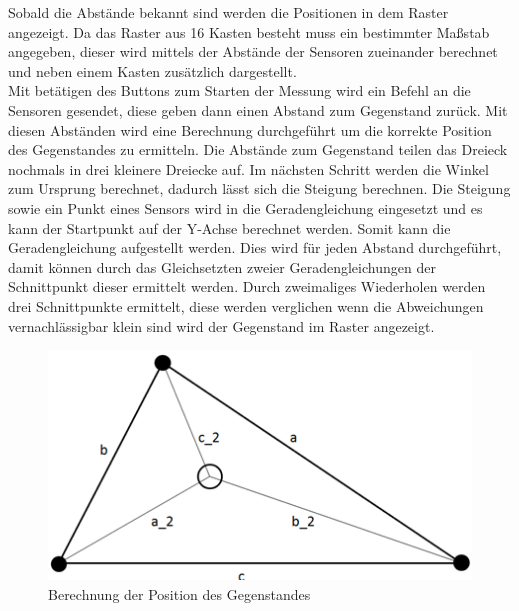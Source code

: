 Sobald die Abstände bekannt sind werden die Positionen in dem Raster angezeigt. Da das Raster aus 16 Kasten besteht muss ein bestimmter Maßstab angegeben, dieser wird mittels der Abstände der Sensoren zueinander berechnet und neben einem Kasten zusätzlich dargestellt.\\
Mit betätigen des Buttons zum Starten der Messung wird ein Befehl an die Sensoren gesendet, diese geben dann einen Abstand zum Gegenstand zurück. Mit diesen Abständen wird eine Berechnung durchgeführt um die korrekte Position des Gegenstandes zu ermitteln. Die Abstände zum Gegenstand teilen das Dreieck nochmals in drei kleinere Dreiecke auf. Im nächsten Schritt werden die Winkel zum Ursprung berechnet, dadurch lässt sich die Steigung berechnen. Die Steigung sowie ein Punkt eines Sensors wird in die Geradengleichung eingesetzt und es kann der Startpunkt auf der Y-Achse berechnet werden. Somit kann die Geradengleichung aufgestellt werden. Dies wird für jeden Abstand durchgeführt, damit können durch das Gleichsetzten zweier Geradengleichungen der Schnittpunkt dieser ermittelt werden. Durch zweimaliges Wiederholen werden drei Schnittpunkte ermittelt, diese werden verglichen wenn die Abweichungen vernachlässigbar klein sind wird der Gegenstand im Raster angezeigt.
\begin{figure}[H]
	\centering
	\includegraphics[scale=1]{images/gui/02.png}
	\caption{Berechnung der Position des Gegenstandes} \label{img:gui2}
\end{figure}

